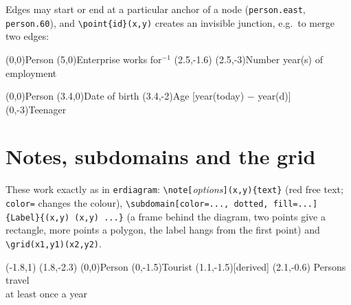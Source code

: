 \documentclass[10pt,a4paper]{article}
\newcommand\cs[1]{\texttt{\textbackslash#1}}
\newcommand\meta[1]{\textlangle\textit{#1}\textrangle}
\begin{document}
Edges may start or end at a particular anchor of a node
(\verb|person.east|, \verb|person.60|), and \cs{point}\verb|{id}(x,y)|
creates an invisible junction, e.g.\ to merge two edges:

\begin{example}
\begin{gsmdiagram}
  (0,0){Person}
  (5,0){Enterprise}
    {works for$^{-1}$}
  (2.5,-1.6)
  (2.5,-3){Number}
    {year(s) of employment}
\end{gsmdiagram}
\end{example}

\begin{example}
\begin{gsmdiagram}
  (0,0){Person}
  (3.4,0){Date of birth}
  (3.4,-2){Age}
    {[year(today) $-$ year(d)]}
  (0,-3){Teenager}
\end{gsmdiagram}
\end{example}

\section{Notes, subdomains and the grid}

These work exactly as in \texttt{erdiagram}:
\verb|\note[|\meta{options}\verb|](x,y){text}| (red free text; \texttt{color=} changes
the colour), \verb|\subdomain[color=..., dotted, fill=...]{Label}{(x,y) (x,y) ...}| (a
frame behind the diagram, two points give a rectangle, more points a
polygon, the label hangs from the first point) and
\verb|\grid(x1,y1)(x2,y2)|.

\begin{example}
\begin{gsmdiagram}
    {(-1.8,1) (1.8,-2.3)}
  (0,0){Person}
  (0,-1.5){Tourist}
  \note[color=blue!70!black](1.1,-1.5){[derived]}
  \note[anchor=west](2.1,-0.6)
    {Persons travel\\at least once a year}
\end{gsmdiagram}
\end{example}
\end{document}
